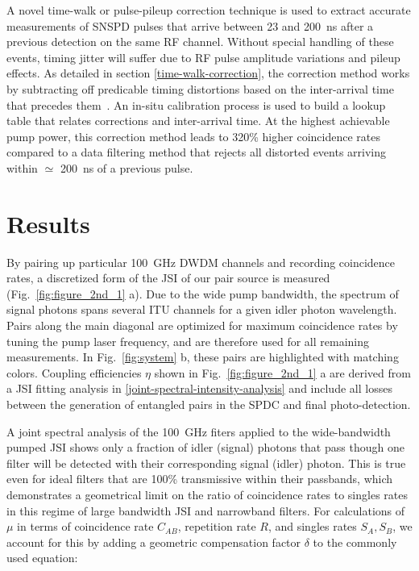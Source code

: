 \documentclass[11pt]{caltech_thesis} %
\begin{document}
A novel time-walk or pulse-pileup correction technique is used to extract accurate measurements of SNSPD pulses that arrive between 23 and 200~ns after a previous detection on the same RF channel. Without special handling of these events, timing jitter will suffer due to RF pulse amplitude variations and pileup effects. As detailed in section \ref{time-walk-correction}, the correction method works by subtracting off predicable timing distortions based on the inter-arrival time that precedes them~\autocite{Mueller2023,Craiciu23}. An in-situ calibration process is used to build a lookup table that relates corrections and inter-arrival time. At the highest achievable pump power, this correction method leads to 320\% higher coincidence rates compared to a data filtering method that rejects all distorted events arriving within $\simeq$ 200~ns of a previous pulse.

\hypertarget{results-1}{%
\section{Results}\label{results-1}}

By pairing up particular 100~GHz DWDM channels and recording coincidence rates, a discretized form of the JSI of our pair source is measured (Fig.~\ref{fig:figure_2nd_1} a). Due to the wide pump bandwidth, the spectrum of signal photons spans several ITU channels for a given idler photon wavelength. Pairs along the main diagonal are optimized for maximum coincidence rates by tuning the pump laser frequency, and are therefore used for all remaining measurements. In Fig.~\ref{fig:system} b, these pairs are highlighted with matching colors. Coupling efficiencies $\eta$ shown in Fig.~\ref{fig:figure_2nd_1} a are derived from a JSI fitting analysis in \ref{joint-spectral-intensity-analysis} and include all losses between the generation of entangled pairs in the SPDC and final photo-detection.

A joint spectral analysis of the 100~GHz fiters applied to the wide-bandwidth pumped JSI shows only a fraction of idler (signal) photons that pass though one filter will be detected with their corresponding signal (idler) photon. This is true even for ideal filters that are 100\% transmissive within their passbands, which demonstrates a geometrical limit on the ratio of coincidence rates to singles rates in this regime of large bandwidth JSI and narrowband filters. For calculations of $\mu$ in terms of coincidence rate $C_{AB}$, repetition rate $R$, and singles rates $S_A, S_B$, we account for this by adding a geometric compensation factor $\delta$ to the commonly used equation:
\end{document}
